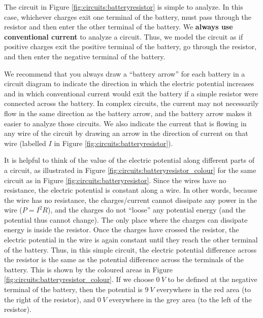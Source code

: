 
The circuit in Figure \ref{fig:circuits:batteryresistor} is simple to analyze. In this case, whichever charges exit one terminal of the battery, must pass through the resistor and then enter the other terminal of the battery. We \textbf{always use conventional current} to analyze a circuit. Thus, we model the circuit as if positive charges exit the positive terminal of the battery, go through the resistor, and then enter the negative terminal of the battery.

We recommend that you always draw a ``battery arrow'' for each battery in a circuit diagram to indicate the direction in which the electric potential increases and in which conventional current would exit the battery if a simple resistor were connected across the battery. In complex circuits, the current may not necessarily flow in the same direction as the battery arrow, and the battery arrow makes it easier to analyze those circuits. We also indicate the current that is flowing in any wire of the circuit by drawing an arrow in the direction of current on that wire (labelled $I$ in Figure \ref{fig:circuits:batteryresistor}).


It is helpful to think of the value of the electric potential along different parts of a circuit, as illustrated in Figure \ref{fig:circuits:batteryresistor_colour} for the same circuit as in Figure \ref{fig:circuits:batteryresistor}.
Since the wires have no resistance, the electric potential is constant along a wire. In other words, because the wire has no resistance, the charges/current cannot dissipate any power in the wire ($P=I^2R$), and the charges do not ``loose'' any potential energy (and the potential thus cannot change). The only place where the charges can dissipate energy is inside the resistor. Once the charges have crossed the resistor, the electric potential in the wire is again constant until they reach the other terminal of the battery. Thus, in this simple circuit, the electric potential difference across the resistor is the same as the potential difference across the terminals of the battery.  This is shown by the coloured areas in Figure \ref{fig:circuits:batteryresistor_colour}. If we choose $\SI{0}{V}$ to be defined at the negative terminal of the battery, then the potential is $\SI{9}{V}$ everywhere in the red area (to the right of the resistor), and $\SI{0}{V}$ everywhere in the grey area (to the left of the resistor). 


